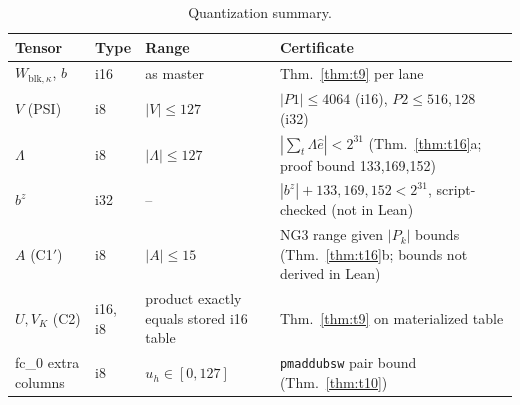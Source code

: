 \documentclass[10pt]{article}
\theoremstyle{plain}
\theoremstyle{definition}
\begin{document}
\begin{table}[htbp]
\centering\small
\caption{Quantization summary.}\label{tab:quant}
\begin{tabularx}{\linewidth}{@{}>{\raggedright}p{2.6cm}l>{\raggedright}p{3.2cm}>{\raggedright\arraybackslash}X@{}}
\toprule
Tensor & Type & Range & Certificate\\
\midrule
$W_{\mathrm{blk},\kappa}$, $b$ & i16 & as master & Thm.~\ref{thm:t9} per lane\\
$V$ (PSI) & i8 & $|V|\le127$ & $|P1|\le4064$ (i16), $P2\le516{,}128$ (i32)\\
$\Lambda$ & i8 & $|\Lambda|\le127$ & $|\sum_t\Lambda\hat e|<2^{31}$ (Thm.~\ref{thm:t16}a; proof bound 133,169,152)\\
$b^z$ & i32 & -- & $|b^z|+133{,}169{,}152<2^{31}$, script-checked (not in Lean)\\
$A$ (C1$'$) & i8 & $|A|\le15$ & NG3 range given $|P_k|$ bounds (Thm.~\ref{thm:t16}b; bounds not derived in Lean)\\
$U,V_K$ (C2) & i16, i8 & product exactly equals stored i16 table & Thm.~\ref{thm:t9} on materialized table\\
fc\_0 extra columns & i8 & $u_h\in[0,127]$ & \texttt{pmaddubsw} pair bound (Thm.~\ref{thm:t10})\\
\bottomrule
\end{tabularx}
\end{table}





\end{document}
